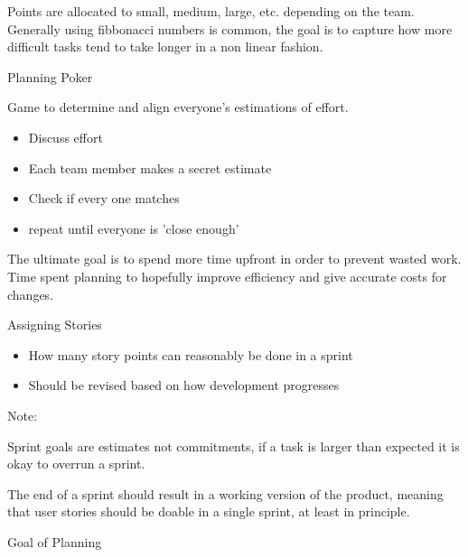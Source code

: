 \documentclass{report}
\begin{document}
\begin{description}
\begin{itemize}
                Points are allocated to small, medium, large, etc.
                depending on the team. Generally using fibbonacci
                numbers is common, the goal is to capture how
                more difficult tasks tend to take longer
                in a non linear fashion.
        \end{itemize}
    \item Planning Poker

        Game to determine and align everyone's estimations
        of effort.

        \begin{itemize}
            \item Discuss effort
            \item Each team member makes a secret estimate
            \item Check if every one matches
            \item repeat until everyone is 'close enough'
        \end{itemize}

        The ultimate goal is to spend more time upfront in
        order to prevent wasted work. Time spent planning
        to hopefully improve efficiency and give accurate
        costs for changes.

    \item Assigning Stories

        \begin{itemize}
            \item How many story points can reasonably
                be done in a sprint
            \item Should be revised based on how
                development progresses
        \end{itemize}
        
        \begin{mdframed}
            Note:

            Sprint goals are estimates not commitments,
            if a task is larger than expected it is okay
            to overrun a sprint.
        \end{mdframed}

        The end of a sprint should result in a working
        version of the product, meaning that user stories
        should be doable in a single sprint, at least in
        principle.


    \item Goal of Planning


\end{description}
\end{document}

